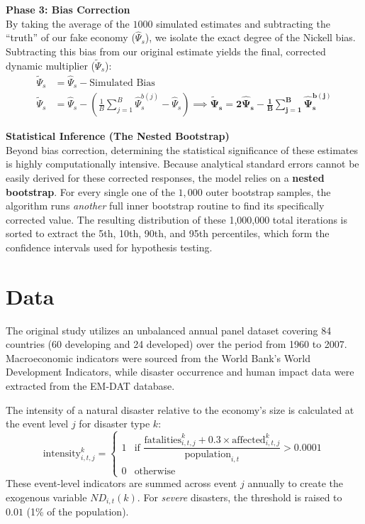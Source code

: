 \documentclass[11pt, a4paper]{article}
\begin{document}
\textbf{Phase 3: Bias Correction} \\
By taking the average of the $1000$ simulated estimates and subtracting the ``truth'' of our fake economy ($\hat{\Psi}_s$), we isolate the exact degree of the Nickell bias. Subtracting this bias from our original estimate yields the final, corrected dynamic multiplier ($\tilde{\Psi}_s$):
\begin{align}
    \tilde{\Psi}_s &= \hat{\Psi}_s - \text{Simulated Bias} \nonumber \\
    \tilde{\Psi}_s &= \hat{\Psi}_s - \left( \frac{1}{B}\sum_{j=1}^{B}\hat{\Psi}_s^{b(j)} - \hat{\Psi}_s \right) \implies \mathbf{\tilde{\Psi}_s = 2\hat{\Psi}_s - \frac{1}{B}\sum_{j=1}^{B}\hat{\Psi}_s^{b(j)}}
\end{align}

\textbf{Statistical Inference (The Nested Bootstrap)} \\
Beyond bias correction, determining the statistical significance of these estimates is highly computationally intensive. Because analytical standard errors cannot be easily derived for these corrected responses, the model relies on a \textbf{nested bootstrap}. For every single one of the $1,000$ outer bootstrap samples, the algorithm runs \textit{another} full inner bootstrap routine to find its specifically corrected value. The resulting distribution of these 1,000,000 total iterations is sorted to extract the 5th, 10th, 90th, and 95th percentiles, which form the confidence intervals used for hypothesis testing.

\section{Data}

The original study utilizes an unbalanced annual panel dataset covering 84 countries (60 developing and 24 developed) over the period from 1960 to 2007. Macroeconomic indicators were sourced from the World Bank's World Development Indicators, while disaster occurrence and human impact data were extracted from the EM-DAT database. 

The intensity of a natural disaster relative to the economy's size is calculated at the event level $j$ for disaster type $k$:
\begin{equation}
    \text{intensity}^k_{i,t,j} =
    \begin{cases}
    1 & \text{if } \dfrac{\text{fatalities}_{i,t,j}^k + 0.3 \times \text{affected}_{i,t,j}^k}{\text{population}_{i,t}} > 0.0001 \\
    0 & \text{otherwise}
    \end{cases}
\end{equation}
These event-level indicators are summed across event $j$ annually to create the exogenous variable $ND_{i,t}(k)$. For \textit{severe} disasters, the threshold is raised to $0.01$ (1\% of the population). 
\end{document}
